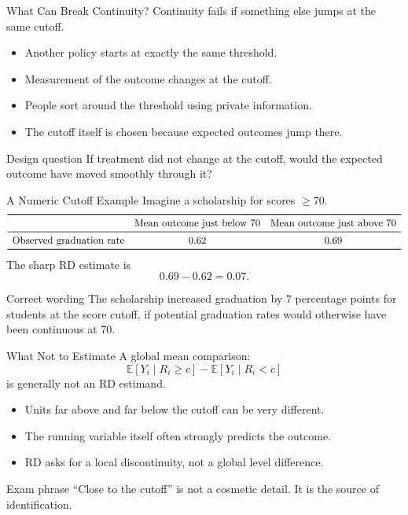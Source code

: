 \documentclass[11pt,aspectratio=169]{beamer}
\newcommand{\E}{\mathbb{E}}
\begin{document}
\begin{frame}{What Can Break Continuity?}
  Continuity fails if something else jumps at the same cutoff.
  \begin{itemize}
    \item Another policy starts at exactly the same threshold.
    \item Measurement of the outcome changes at the cutoff.
    \item People sort around the threshold using private information.
    \item The cutoff itself is chosen because expected outcomes jump there.
  \end{itemize}
  \begin{block}{Design question}
    If treatment did not change at the cutoff, would the expected outcome have moved smoothly through it?
  \end{block}
\end{frame}

\begin{frame}{A Numeric Cutoff Example}
  Imagine a scholarship for scores \(\geq 70\).
  \[
  \begin{array}{lcc}
  \toprule
  & \text{Mean outcome just below 70} & \text{Mean outcome just above 70} \\
  \midrule
  \text{Observed graduation rate} & 0.62 & 0.69 \\
  \bottomrule
  \end{array}
  \]
  The sharp RD estimate is
  \[
    0.69-0.62=0.07.
  \]
  \begin{block}{Correct wording}
    The scholarship increased graduation by 7 percentage points for students at the score cutoff, if potential graduation rates would otherwise have been continuous at 70.
  \end{block}
\end{frame}

\begin{frame}{What Not to Estimate}
  A global mean comparison:
  \[
    \E[Y_i\mid R_i\geq c]-\E[Y_i\mid R_i<c]
  \]
  is generally not an RD estimand.
  \begin{itemize}
    \item Units far above and far below the cutoff can be very different.
    \item The running variable itself often strongly predicts the outcome.
    \item RD asks for a local discontinuity, not a global level difference.
  \end{itemize}
  \begin{block}{Exam phrase}
    ``Close to the cutoff'' is not a cosmetic detail. It is the source of identification.
  \end{block}
\end{frame}
\end{document}
